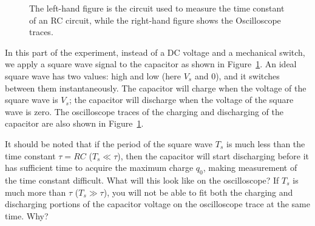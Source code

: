 \documentclass[12pt]{article}
\begin{document}
\begin{figure}
  \centering
   \qquad
  \caption{The left-hand figure is the circuit used to measure the
    time constant of an RC circuit, while the right-hand figure shows
    the Oscilloscope traces.}
  \label{fig:RCmeasuring}
\end{figure}
In this part of the experiment, instead of a DC voltage and a
mechanical switch, we apply a square wave signal to the capacitor as
shown in Figure~\ref{fig:RCmeasuring}.  An ideal square wave has two
values: high and low (here $V_s$ and 0), and it switches between them
instantaneously.  The capacitor will charge when the voltage of the
square wave is $V_s$; the capacitor will discharge when the voltage of
the square wave is zero.  The oscilloscope traces of the charging and
discharging of the capacitor are also shown in
Figure~\ref{fig:RCmeasuring}.

It should be noted that if the period of the square wave $T_s$ is much
less than the time constant $\tau = RC$ ($T_s \ll \tau$), then the
capacitor will start discharging before it has sufficient time to
acquire the maximum charge $q_0$, making measurement of the time
constant difficult.  What will this look like on the oscilloscope?  If
$T_s$ is much more than $\tau$ ($T_s \gg \tau$), you will not be able
to fit both the charging and discharging portions of the capacitor
voltage on the oscilloscope trace at the same time.  Why?
\end{document}
